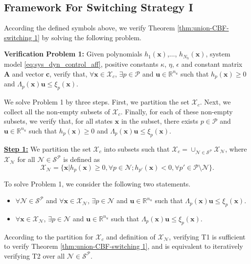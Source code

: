 \documentclass[letterpaper, 10 pt, conference]{ieeeconf}  %
\begin{document}
\subsection{Framework For Switching Strategy I}
\label{sec:verification_I}
According the defined symbols above, we verify Theorem \ref{thm:union-CBF-switching 1} by solving the following problem.

\textbf{Verification Problem 1: }Given polynomials $h_1(\mathbf{x})$,$\dots$, $h_{N_h}(\mathbf{x})$, system model \eqref{eq:sys_dyn_control_aff}, positive constants $\kappa$, $\eta$, $\epsilon$ and constant matrix $\mathbf{A}$ and vector $\mathbf{c}$, verify that, $\forall\mathbf{x}\in\mathcal{X}_c$, $\exists p\in\mathcal{P}$ and $\mathbf{u}\in\mathbb{R}^{n_u}$ such that $h_p(\mathbf{x})\geq 0$ and $\Lambda_p(\mathbf{x})\mathbf{u}\leq\xi_p(\mathbf{x})$.

We solve Problem 1 by three steps. First, we partition the set $\mathcal{X}_c$. Next, we collect all the non-empty subsets of $\mathcal{X}_c$. Finally, for each of these non-empty subsets, we verify that, for all states $\mathbf{x}$ in the subset, there exists $p\in\mathcal{P}$ and $\mathbf{u}\in\mathbb{R}^{n_u}$ such that $h_p(\mathbf{x})\geq 0$ and $\Lambda_p(\mathbf{x})\mathbf{u}\leq\xi_p(\mathbf{x})$.

\textbf{\underline{Step 1:}} We partition the set $\mathcal{X}_c$ into subsets such that $\mathcal{X}_c = \cup_{\mathcal{N}\in \mathcal{S}^{\mathcal{P}}}\mathcal{X}_{\mathcal{N}}$, where $\mathcal{X}_{\mathcal{N}}$ for all $\mathcal{N}\in \mathcal{S}^{\mathcal{P}}$ is defined as
\begin{equation*}
    \mathcal{X}_{\mathcal{N}} = \{\mathbf{x}|h_p(\mathbf{x})\geq0, \forall p\in\mathcal{N}; h_{p'}(\mathbf{x})<0, \forall p'\in\mathcal{P}\setminus\mathcal{N}\}.
\end{equation*}

To solve Problem 1, we consider the following two statements.
\begin{itemize}
    \item [T1: ]$\forall \mathcal{N}\in\mathcal{S}^{\mathcal{P}}$ and $\forall \mathbf{x}\in\mathcal{X}_{\mathcal{N}}$, $\exists p\in\mathcal{N}$ and $\mathbf{u}\in\mathbb{R}^{n_u}$ such that $\Lambda_p(\mathbf{x})\mathbf{u}\leq\xi_p(\mathbf{x})$.
    \item [T2: ]$\forall \mathbf{x}\in\mathcal{X}_{\mathcal{N}}$, $\exists p\in\mathcal{N}$ and $\mathbf{u}\in\mathbb{R}^{n_u}$ such that $\Lambda_p(\mathbf{x})\mathbf{u}\leq\xi_p(\mathbf{x})$.
\end{itemize}
According to the partition for $\mathcal{X}_c$ and definition of $\mathcal{X}_{\mathcal{N}}$, verifying T1 is sufficient to verify Theorem \ref{thm:union-CBF-switching 1}, and is equivalent to iteratively verifying T2 over all $\mathcal{N}\in\mathcal{S}^{\mathcal{P}}$. 
\end{document}
